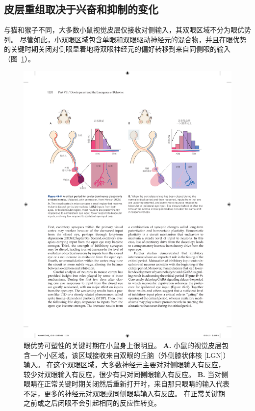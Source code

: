 \subsection{皮层重组取决于兴奋和抑制的变化}

与猫和猴子不同，大多数小鼠视觉皮层仅接收对侧输入，其双眼区域不分为眼优势列。
尽管如此，小双眼区域包含单眼和双眼驱动神经元的混合物，并且在眼优势的关键时期关闭对侧眼显着地将双眼神经元的偏好转移到来自同侧眼的输入（图~\ref{fig:49_8}）。


\begin{figure}[htbp]
	\centering
	\includegraphics[width=0.9\linewidth]{chap49/fig_49_8}
	\caption{眼优势可塑性的关键时期在小鼠身上很明显\cite{hensch2005critical}。
		\textbf{A.} 小鼠的视觉皮层包含一个小区域，该区域接收来自双眼的丘脑（外侧膝状体核 [LGN]）输入。
		在这个双眼区域，大多数神经元主要对对侧眼输入有反应，较少对双眼输入有反应，很少有只对同侧眼输入有反应。
		\textbf{B.} 当对侧眼睛在正常关键时期关闭然后重新打开时，来自那只眼睛的输入代表不足，更多的神经元对双眼或同侧眼睛输入有反应。
		在正常关键期之前或之后闭眼不会引起相同的反应性转变。}
	\label{fig:49_8}
\end{figure}


